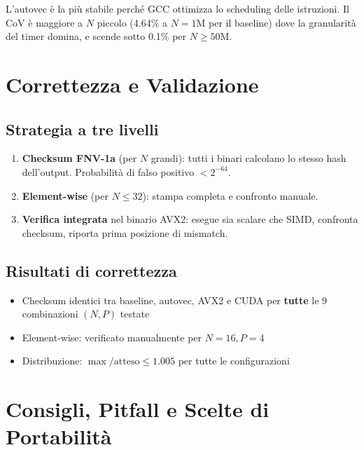 \documentclass[11pt,a4paper]{article}
\begin{document}
L'autovec è la più stabile perché GCC ottimizza lo scheduling delle istruzioni. Il CoV è maggiore a $N$ piccolo (4.64\% a $N=1$M per il baseline) dove la granularità del timer domina, e scende sotto 0.1\% per $N \geq 50$M.


\section{Correttezza e Validazione}

\subsection{Strategia a tre livelli}

\begin{enumerate}
    \item \textbf{Checksum FNV-1a} (per $N$ grandi): tutti i binari calcolano lo stesso hash dell'output. Probabilità di falso positivo $< 2^{-64}$.
    \item \textbf{Element-wise} (per $N \leq 32$): stampa completa e confronto manuale.
    \item \textbf{Verifica integrata} nel binario AVX2: esegue sia scalare che SIMD, confronta checksum, riporta prima posizione di mismatch.
\end{enumerate}

\subsection{Risultati di correttezza}
\begin{itemize}
    \item Checksum identici tra baseline, autovec, AVX2 e CUDA per \textbf{tutte} le 9 combinazioni $(N, P)$ testate
    \item Element-wise: verificato manualmente per $N=16, P=4$
    \item Distribuzione: $\max / \text{atteso} \leq 1.005$ per tutte le configurazioni
\end{itemize}


\section{Consigli, Pitfall e Scelte di Portabilità}
\end{document}
